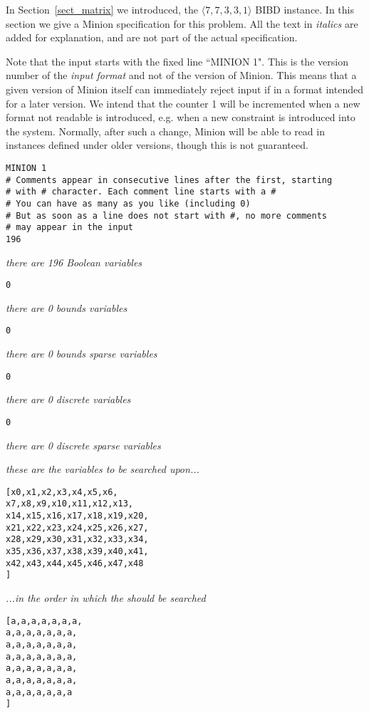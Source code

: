 \documentclass{article}
\begin{document}
\begin{small}
In Section~\ref{sect_matrix} we introduced, the $\langle 7, 7, 3, 3,
1\rangle$ BIBD instance. In this section we give a Minion specification
for this problem. All the text in \emph{italics} are added for
explanation, and are not part of the actual specification.

Note that the input starts with the fixed line ``MINION 1".   This is the version number of the 
{\em input format} and not of the version of {\sc Minion}.   This means that a given version 
of {\sc Minion} itself can immediately reject input if in a format intended for a later version.
We intend that the counter 1 will be incremented when a new format not readable is introduced, 
e.g. when a new constraint is introduced into the system.    Normally, after such a change,
{\sc Minion} will be able to read in instances defined under older versions, though this
is not guaranteed.


\begin{verbatim}
MINION 1
# Comments appear in consecutive lines after the first, starting 
# with # character. Each comment line starts with a #
# You can have as many as you like (including 0)
# But as soon as a line does not start with #, no more comments 
# may appear in the input
196
\end{verbatim}
\emph{there are 196 Boolean variables}
\begin{verbatim}
0
\end{verbatim}
\emph{there are 0 bounds variables}
\begin{verbatim}
0
\end{verbatim}
\emph{there are 0 bounds sparse variables}
\begin{verbatim}
0
\end{verbatim}
\emph{there are 0 discrete variables}
\begin{verbatim}
0
\end{verbatim}
\emph{there are 0 discrete sparse variables}

\emph{these are the variables to be searched upon...}
\begin{verbatim}
[x0,x1,x2,x3,x4,x5,x6,
x7,x8,x9,x10,x11,x12,x13,
x14,x15,x16,x17,x18,x19,x20,
x21,x22,x23,x24,x25,x26,x27,
x28,x29,x30,x31,x32,x33,x34,
x35,x36,x37,x38,x39,x40,x41,
x42,x43,x44,x45,x46,x47,x48
]
\end{verbatim}
\emph{...in the order in which the should be searched}
\begin{verbatim}
[a,a,a,a,a,a,a,
a,a,a,a,a,a,a,
a,a,a,a,a,a,a,
a,a,a,a,a,a,a,
a,a,a,a,a,a,a,
a,a,a,a,a,a,a,
a,a,a,a,a,a,a
]
\end{verbatim}


\end{small}
\end{document}
